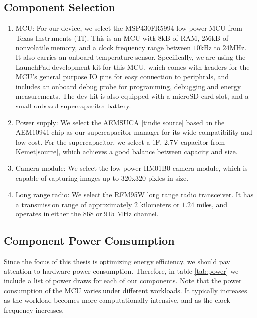 \documentclass[twoside]{report}
\begin{document}
\subsection{Component Selection}
\begin{enumerate}
    \item MCU: For our device, we select the MSP430FR5994 low-power MCU from Texas Instruments (TI). 
    This is an MCU with $8$kB of RAM, $256$kB of nonvolatile memory, and a clock frequency range between 
    $10$kHz to $24$MHz. It also carries an onboard temperature sensor. 
    Specifically, we are using the LaunchPad development kit for this MCU, which comes with headers for 
    the MCU's general purpose IO pins for easy connection to periphrals, and
    includes an onboard debug probe for programming, debugging and energy measurements. 
    The dev kit is also equipped with a microSD card slot, and a small onboard supercapacitor battery.
    \item Power supply: We select the AEMSUCA [tindie source] based on the AEM10941 chip as our 
    supercapacitor manager for its wide compatibility and low cost. For the supercapacitor, we select 
    a 1F, 2.7V capacitor from Kemet[source], which achieves a good balance between capacity and size.
    \item Camera module: We select the low-power HM01B0 camera module, which is capable of capturing images up to 
          $320$x$320$ pixles in size.
    \item Long range radio: We select the RFM95W long range radio transceiver. It has a transmission range of 
          approximately $2$ kilometers or $1.24$ miles, and operates in either the 868 or 915 MHz channel.
\end{enumerate}

\subsection{Component Power Consumption}
Since the focus of this thesis is optimizing energy efficiency, we should pay attention to hardware power 
consumption. Therefore, in table \ref{tab:power} we include a list of power draws for each of our components. 
Note that the power consumption of the MCU varies under different workloads. It typically increases as the workload becomes more computationally 
intensive, and as the clock frequency increases.
\end{document}
